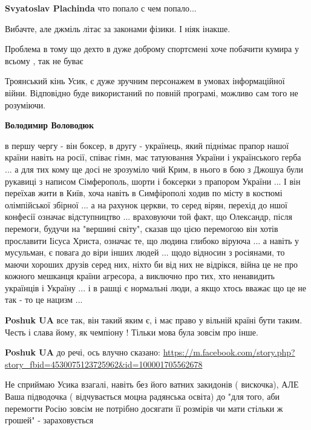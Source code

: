 \begin{itemize}
\begin{itemize} %
\textbf{Svyatoslav Plachinda} что попало с чем попало...
\end{itemize} %

Вибачте, але джміль літає за законами фізики. І ніяк інакше.

Проблема в тому що дехто в дуже доброму спортсмені хоче побачити кумира у всьому , так не буває


Троянський кінь Усик, є дуже зручним персонажем в умовах інформаційної війни.
Відповідно буде використаний по повній програмі, можливо сам того не розуміючи.

\begin{itemize} %
\textbf{Володимир Воловодюк} 

в першу чергу - він боксер, в другу - українець, який піднімає прапор нашої
країни навіть на росії, співає гімн, має татуювання України і українського
герба ... а для тих кому ще досі не зрозуміло чий Крим, в нього в бою з Джошуа
були рукавиці з написом Сімферополь, шорти і боксерки з прапором України ... І
він переїхав жити в Київ, хоча навіть в Симфірополі ходив по місту в костюмі
олімпійської збірної ... а на рахунок церкви, то серед вірян, перехід до ншої
конфесії означає відступництво ... враховуючи той факт, що Олександр, після
перемоги, будучи на "вершині світу", сказав що цією перемогою він хотів
прославити Іісуса Христа, означає те, що людина глибоко віруюча ... а навіть у
мусульман, є повага до віри інших людей ... щодо відносин з росіянами, то маючи
хороших друзів серед них, ніхто би від них не відрікся, війна це не про кожного
мешканця країни агресора, а виключно про тих, хто ненавидить українців і
Україну ... і в рашці є нормальні люди, а якщо хтось вважає що це не так - то
це нацизм ...


\textbf{Poshuk UA} все так, він такий яким є, і має право у вільній країні бути таким. Честь і слава йому, як чемпіону !
Тільки мова була зовсім про інше.

\textbf{Poshuk UA} до речі, ось влучно сказано:
\url{https://m.facebook.com/story.php?story_fbid=4530075123725962&id=100001705562678}

\end{itemize} %


Не сприймаю Усика взагалі, навіть без його ватних закидонів ( вискочка), АЛЕ
Ваша підводочка ( відчувається моцна радянська освіта) до "для того, аби
перемогти Росію зовсім не потрібно досягати її розмірів чи мати стільки ж
грошей" - зараховується


\end{itemize}
